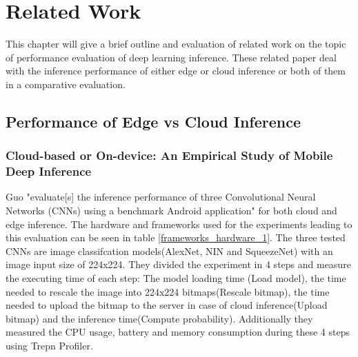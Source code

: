 \chapter{Related Work}
\label{chap:relatedWork}
This chapter will give a brief outline and evaluation of related work on the topic of performance evaluation of deep learning inference. These related paper deal with the inference performance of either edge or cloud inference or both of them in a comparative evaluation.

\section{Performance of Edge vs Cloud Inference}


\subsection{Cloud-based or On-device:
An Empirical Study of Mobile Deep Inference}
Guo "evaluate[s] the inference performance of three Convolutional Neural Networks
(CNNs) using a benchmark Android application" \cite{DBLP:conf/ic2e/Guo18} for both cloud and edge inference. The hardware and frameworks used for the experiments leading to this evaluation can be seen in table \ref{frameworks_hardware_1}. The three tested CNNs are image classifcation models(AlexNet, NIN and SqueezeNet) with an image input size of 224x224.
They divided the experiment in 4 steps and measure the executing time of each step: 
The model loading time (Load model), the time needed to rescale the image into 224x224 bitmaps(Rescale bitmap), the time needed to upload the bitmap to the server in case of cloud inference(Upload bitmap) and the inference time(Compute probability).
Additionally they measured the CPU usage, battery and memory consumption during these 4 steps using Trepn Profiler.

